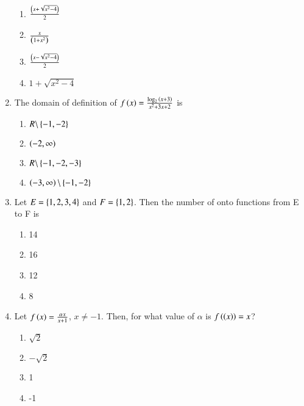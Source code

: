 \documentclass[journal,12pt,twocolumn]{IEEEtran}
\theoremstyle{remark}
\begin{document}
\begin{enumerate}
\begin{multicols}{2}
	\begin{enumerate}
		\item $\frac{\left(x+\sqrt{x^{2}-4}\right)}{2}$ 
		\item $\frac{x}{\left(1+x^{2}\right)}$
		\item $\frac{\left(x-\sqrt{x^{2}-4}\right)}{2}$ 
		\item $1+\sqrt{x^{2}-4}$
	\end{enumerate}
\end{multicols}

\item The domain of definition of $f\left(x\right)=\frac{\log_{2}{\left(x+3\right)}}{x^{2}+3x+2}$ is

\hfill{}

\begin{multicols}{2}
	\begin{enumerate}
		\item $R \backslash \left\{-1,-2\right\}$ 
		\item $\left(-2,\infty\right)$
		\item $R \backslash \left\{-1,-2,-3\right\}$ 
		\item $\left(-3,\infty\right)\backslash\left\{-1,-2\right\}$
	\end{enumerate}
\end{multicols}
                                                                                        
\item Let $E=\left\{1,2,3,4\right\}$ and $F=\left\{1,2\right\}$. Then the number of onto functions from E to F is

\hfill{}

\begin{multicols}{4}
	\begin{enumerate}
		\item 14 
		\item 16 
		\item 12 
		\item 8
	\end{enumerate}
\end{multicols}

\item Let $f\left(x\right)=\frac{\alpha x}{x+1}$, $x\neq-1$. Then, for what value of $\alpha$ is $f\left(\left(x\right)\right)=x$?

\hfill{}

\begin{multicols}{4}
	\begin{enumerate}
		\item $\sqrt{2}$ 
		\item $-\sqrt{2}$ 
		\item 1 
		\item -1
	\end{enumerate}
\end{multicols}

\end{enumerate}
\end{document}
